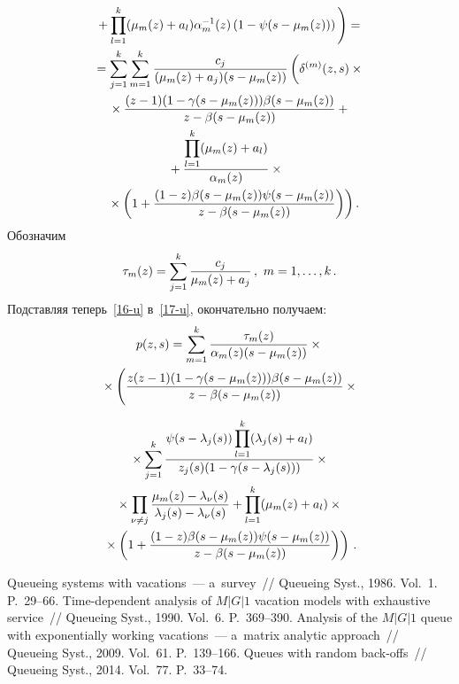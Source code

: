 \begin{multicols}{2}
\noindent
\begin{multline}
\label{17-u}
{}+
\prod\limits_{l=1}^k(\mu_m(z)+a_l)\alpha_m^{-1}(z)
\left(1-\psi(s-\mu_m(z))\right)\Bigg)={}\\
{}=
\sum\limits_{j=1}^k\sum\limits_{m=1}^k\fr{c_j}{(\mu_m(z)+a_j)(s-\mu_m(z))}
\left(
\vphantom{\fr{(1-z)\beta(s-\mu_m(z))\psi(s-\mu_m(z))}{z-\beta(s-\mu_m(z))}}
\delta^{(m)}(z,s)\times{}\right.\\
{}\times\fr{(z-1)(1-\gamma(s-\mu_m(z)))\beta(s-\mu_m(z))}
{z-\beta(s-\mu_m(z))}+{}\\
\hspace*{-2mm}{}+
\fr{\prod\limits_{l=1}^k(\mu_m(z)+a_l)}{\alpha_m(z)}\times{}\\
\left.{}\times
\left(1+\fr{(1-z)\beta(s-\mu_m(z))\psi(s-\mu_m(z))}{z-\beta(s-\mu_m(z))}\right)\right).\!\!\!
\end{multline}
Обозначим
$$
\tau_m(z)=\sum\limits_{j=1}^k\fr{c_j}{\mu_m(z)+a_j}\,,\ m=1,\ldots,k\,.
$$
Подставляя теперь~\eqref{16-u} в~\eqref{17-u}, окончательно получаем:
\begin{multline*}
p(z,s)=\sum\limits_{m=1}^k\displaystyle\frac{\displaystyle \tau_m(z)\mathstrut}{\displaystyle \alpha_m(z)(s-\mu_m(z))\mathstrut}\times{}\\
{}\times
\Bigg(\displaystyle\frac{\displaystyle z(z-1)(1-\gamma(s-\mu_m(z)))\beta(s-\mu_m(z))\mathstrut}{\displaystyle z-\beta(s-\mu_m(z))\mathstrut}\times{}\\
\end{multline*}

\noindent
\begin{multline*}
{}\times
\sum\limits_{j=1}^k\displaystyle\frac{\displaystyle \psi(s-\lambda_j(s))\prod\limits_{l=1}^k(\lambda_j(s)+a_l)\mathstrut}{\displaystyle z_j(s)(1-\gamma(s-\lambda_j(s)))\mathstrut}\times{}\\
{}\times \prod\limits_{\nu\ne j}
\displaystyle\frac{\displaystyle \mu_m(z)-\lambda_{\nu}(s)\mathstrut}{\displaystyle \lambda_j(s)-\lambda_{\nu}(s)\mathstrut}+
\prod\limits_{l=1}^k(\mu_m(z)+a_l)\times{}\\
\left.{}\times\left(
1+\displaystyle\frac{\displaystyle (1-z)\beta(s-\mu_m(z))\psi(s-\mu_m(z))\mathstrut}{\displaystyle z-\beta(s-\mu_m(z))\mathstrut}\right)\right)\,.
\end{multline*}

{\small\frenchspacing
 {%
 \begin{thebibliography}{99}
Queueing systems with vacations~--- a~survey~// Queueing Syst., 1986. 
Vol.~1.  P.~29--66.
Time-dependent analysis of $M|G|1$ vacation models with exhaustive service~// 
Queueing Syst., 1990. Vol.~6.  P.~369--390.
Analysis of the $M|G|1$ queue with exponentially working vacations~--- 
a~matrix analytic approach~// Queueing Syst., 2009. Vol.~61. P.~139--166.
Queues with random back-offs~// Queueing Syst., 2014. Vol.~77. P.~33--74.

\end{thebibliography}

 }
 }

\end{multicols}

